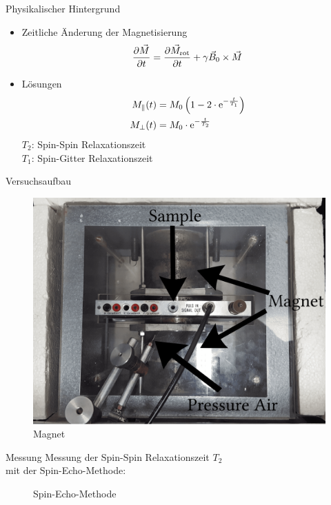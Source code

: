 \begin{frame}{Physikalischer Hintergrund}
	\begin{itemize}
	\item Zeitliche Änderung der Magnetisierung
	\begin{align*}
	\pdv{\vec{M}}{t}=\pdv{\vec{M}_\text{rot}}{t}+\gamma\vec{B}_0\times\vec{M}
	\end{align*}
	\item Lösungen
	\begin{align*}
	M_\parallel (t)&=M_0\left(1-2\cdot\mathrm{e}^{-\frac{t}{T_1}}\right)\\
	M_\bot(t)&=M_0\cdot\mathrm{e}^{-\frac{t}{T_2}}
	\end{align*}
	$T_{2}$: Spin-Spin Relaxationszeit\\
	$T_{1}$: Spin-Gitter Relaxationszeit
	\end{itemize}
\end{frame}

\begin{frame}{Versuchsaufbau}
	\begin{figure}
	\centering
	\includegraphics[scale=.075]{images//magnet.png}
	\caption{Magnet}
	\end{figure}
\end{frame}

\begin{frame}{Messung}
Messung der Spin-Spin Relaxationszeit $T_2$\\mit der Spin-Echo-Methode:
	\begin{figure}
	\centering
	
	\caption{Spin-Echo-Methode}
	\end{figure}
\end{frame}

